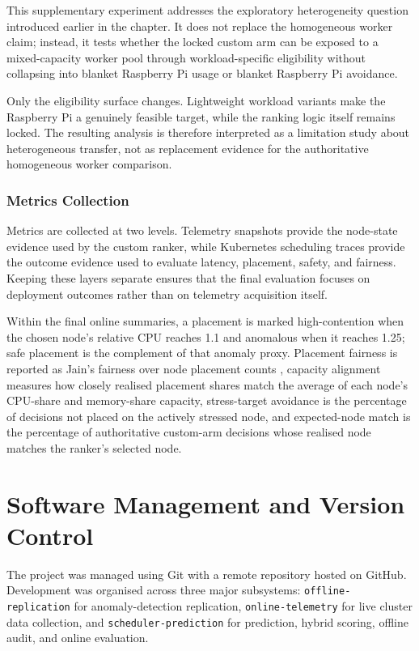 This supplementary experiment addresses the exploratory heterogeneity question introduced earlier in the chapter. It does not replace the homogeneous worker claim; instead, it tests whether the locked custom arm can be exposed to a mixed-capacity worker pool through workload-specific eligibility without collapsing into blanket Raspberry Pi usage or blanket Raspberry Pi avoidance.

Only the eligibility surface changes. Lightweight workload variants make the Raspberry Pi a genuinely feasible target, while the ranking logic itself remains locked. The resulting analysis is therefore interpreted as a limitation study about heterogeneous transfer, not as replacement evidence for the authoritative homogeneous worker comparison.

\subsubsection{Metrics Collection}

Metrics are collected at two levels. Telemetry snapshots provide the node-state evidence used by the custom ranker, while Kubernetes scheduling traces provide the outcome evidence used to evaluate latency, placement, safety, and fairness. Keeping these layers separate ensures that the final evaluation focuses on deployment outcomes rather than on telemetry acquisition itself.

Within the final online summaries, a placement is marked high-contention when the chosen node's relative CPU reaches 1.1 and anomalous when it reaches 1.25; safe placement is the complement of that anomaly proxy. Placement fairness is reported as Jain's fairness over node placement counts \cite{jain1984quantitative}, capacity alignment measures how closely realised placement shares match the average of each node's CPU-share and memory-share capacity, stress-target avoidance is the percentage of decisions not placed on the actively stressed node, and expected-node match is the percentage of authoritative custom-arm decisions whose realised node matches the ranker's selected node.

\section{Software Management and Version Control}

The project was managed using Git with a remote repository hosted on GitHub. Development was organised across three major subsystems: \texttt{offline-replication} for anomaly-detection replication, \texttt{online-telemetry} for live cluster data collection, and \texttt{scheduler-prediction} for prediction, hybrid scoring, offline audit, and online evaluation.

